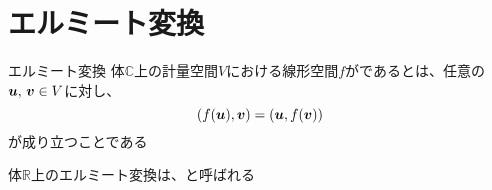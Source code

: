 \documentclass[../../../topic_linear-algebra]{subfiles}
\begin{document}
\sectionline
\section{エルミート変換}

\begin{definition}{エルミート変換}
  体$\mathbb{C}$上の計量空間$V$における線形空間$f$がであるとは、任意の$\vb*{u},\,\vb*{v} \in V$に対し、
  \begin{equation*}
    (f(\vb*{u}), \vb*{v}) = (\vb*{u}, f(\vb*{v}))
  \end{equation*}
  が成り立つことである
\end{definition}

体$\mathbb{R}$上のエルミート変換は、と呼ばれる
\end{document}
